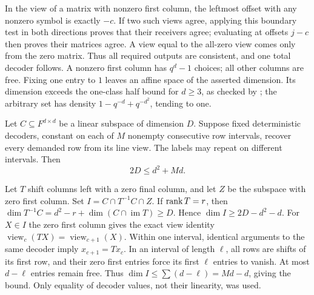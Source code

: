 \begin{outline}
In the view of a matrix with nonzero first column, the leftmost offset
with any nonzero symbol is exactly $-c$. If two such views agree, applying
this boundary test in both directions proves that their receivers agree;
evaluating at offsets $j-c$ then proves their matrices agree. A view
equal to the all-zero view comes only from the zero matrix. Thus all
required outputs are consistent, and one total decoder follows. A nonzero first column
has $q^d-1$ choices; all other columns are free. Fixing one entry to $1$
leaves an affine space of the asserted dimension. Its dimension exceeds
the one-class half bound for $d\ge3$, as checked by
; the arbitrary set has density
$1-q^{-d}+q^{-d^2}$, tending to one.
\end{outline}

\begin{theorem}\label{thm:line-deterministic}
Let $C\subseteq F^{d\times d}$ be a linear subspace of dimension $D$.
Suppose fixed deterministic decoders, constant on each of $M$ nonempty
consecutive row intervals, recover every demanded row from its line view.
The labels may repeat on different intervals. Then
\[
 2D\le d^2+Md.
\]
\end{theorem}

\begin{outline}
Let $T$ shift columns left with a zero final column, and let $Z$ be the
subspace with zero first column. Set $I=C\cap T^{-1}C\cap Z$.
If $\operatorname{rank} T=r$, then
$\dim T^{-1}C=d^2-r+\dim(C\cap\operatorname{im}T)\ge D$.
Hence $\dim I\ge2D-d^2-d$. For $X\in I$ the zero first column gives
the exact view identity
$\operatorname{view}_c(TX)=\operatorname{view}_{c+1}(X)$.
Within one interval, identical arguments to the same decoder imply
$x_{c+1}=Tx_c$. In an interval of length $\ell$, all rows are shifts of
its first row, and their zero first entries force its first $\ell$ entries
to vanish. At most $d-\ell$ entries remain free. Thus
$\dim I\le\sum(d-\ell)=Md-d$, giving the bound. Only equality of decoder
values, not their linearity, was used.
\end{outline}

